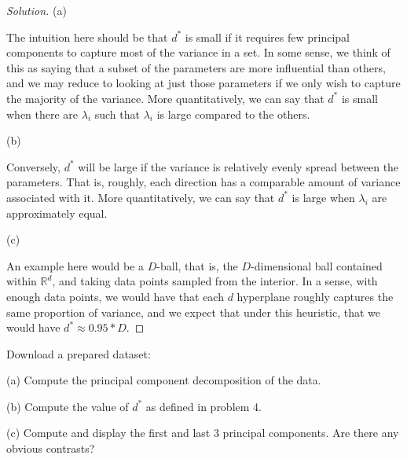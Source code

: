 \documentclass[10pt]{article}
\newenvironment{problem}[2][]{\begin{trivlist}
\item[\hskip \labelsep {\bfseries #1}\hskip \labelsep {\bfseries #2.}]}{\end{trivlist}}
\begin{document}
\begin{proof}[Solution]

(a)

The intuition here should be that $d^*$ is small if it requires few principal components to capture most of the variance in a set. In some sense, we think of this as saying that a subset of the parameters are more influential than others, and we may reduce to looking at just those parameters if we only wish to capture the majority of the variance. More quantitatively, we can say that $d^*$ is small when there are $\lambda_i$ such that $\lambda_i$ is large compared to the others.

(b)

Conversely, $d^*$ will be large if the variance is relatively evenly spread between the parameters. That is, roughly, each direction has a comparable amount of variance associated with it. More quantitatively, we can say that $d^*$ is large when $\lambda_i$ are approximately equal.

(c)

An example here would be a $D$-ball, that is, the $D$-dimensional ball contained within $\mathbb{R}^d$, and taking data points sampled from the interior. In a sense, with enough data points, we would have that each $d$ hyperplane roughly captures the same proportion of variance, and we expect that under this heuristic, that we would have $d^* \approx 0.95*D$.



\end{proof}

\begin{problem}{Question 5}
Download a prepared dataset:

(a) Compute the principal component decomposition of the data.

(b) Compute the value of $d^*$ as defined in problem 4.

(c) Compute and display the first and last 3 principal components. Are there any obvious contrasts?

\end{problem}
\end{document}
